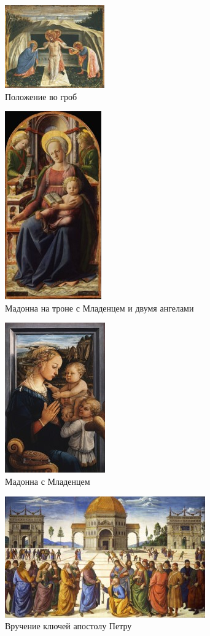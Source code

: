 \begin{figure}[ht]
    \centering
    \includegraphics{img/italiy/5.jpg}
    \caption{Положение во гроб}\label{fig:italy:5}
\end{figure}

\begin{figure}[ht]
    \centering
    \includegraphics{img/italiy/6.jpg}
    \caption{Мадонна на троне с Младенцем и двумя ангелами}\label{fig:italy:6}
\end{figure}

\begin{figure}[ht]
    \centering
    \includegraphics{img/italiy/7.jpg}
    \caption{Мадонна с Младенцем}\label{fig:italy:7}
\end{figure}

\begin{figure}[ht]
    \centering
    \includegraphics{img/italiy/8.jpg}
    \caption{Вручение ключей апостолу Петру}\label{fig:italy:8}
\end{figure}

